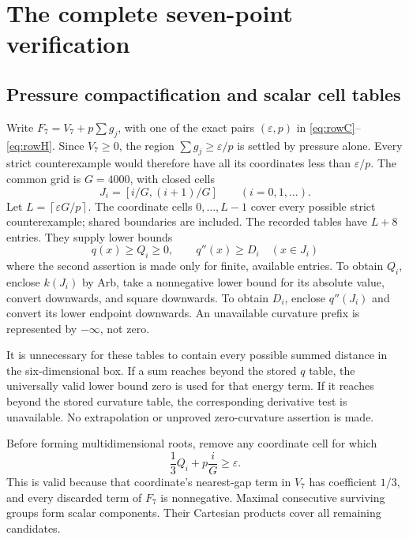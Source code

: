 \documentclass[11pt]{amsart}
\numberwithin{equation}{section}
\newcommand{\eps}{\varepsilon}
\newcommand{\ceil}[1]{\left\lceil #1\right\rceil}
\begin{document}
\section{The complete seven-point verification}

\subsection{Pressure compactification and scalar cell tables}

Write $F_7=V_7+p\sum g_j$, with one of the exact pairs
$(\eps,p)$ in \eqref{eq:rowC}--\eqref{eq:rowH}. Since $V_7\geq0$,
the region $\sum g_j\geq\eps/p$ is settled by pressure alone.
Every strict counterexample would therefore have all its coordinates
less than $\eps/p$. The common grid is $G=4000$, with closed cells
\begin{equation}\label{eq:cells}
 J_i=[i/G,(i+1)/G]\qquad(i=0,1,\ldots).
\end{equation}
Let $L=\ceil{\eps G/p}$. The coordinate cells $0,\ldots,L-1$
cover every possible strict counterexample; shared boundaries are
included. The recorded tables have $L+8$ entries. They supply lower
bounds
\begin{equation}\label{eq:tables}
 q(x)\geq Q_i\geq0,\qquad q''(x)\geq D_i\quad(x\in J_i)
\end{equation}
where the second assertion is made only for finite, available entries.
To obtain $Q_i$, enclose $k(J_i)$ by Arb, take a nonnegative lower
bound for its absolute value, convert downwards, and square downwards.
To obtain $D_i$, enclose $q''(J_i)$ and convert its lower endpoint
downwards. An unavailable curvature prefix is represented by
$-\infty$, not zero.

It is unnecessary for these tables to contain every possible summed
distance in the six-dimensional box. If a sum reaches beyond the
stored $q$ table, the universally valid lower bound zero is used for
that energy term. If it reaches beyond the stored curvature table,
the corresponding derivative test is unavailable. No extrapolation or
unproved zero-curvature assertion is made.

Before forming multidimensional roots, remove any coordinate cell for
which
\begin{equation}\label{eq:singleprune}
 \frac13 Q_i+p\frac iG\geq\eps.
\end{equation}
This is valid because that coordinate's nearest-gap term in $V_7$
has coefficient $1/3$, and every discarded term of $F_7$ is
nonnegative. Maximal consecutive surviving groups form scalar
components. Their Cartesian products cover all remaining candidates.
\end{document}
